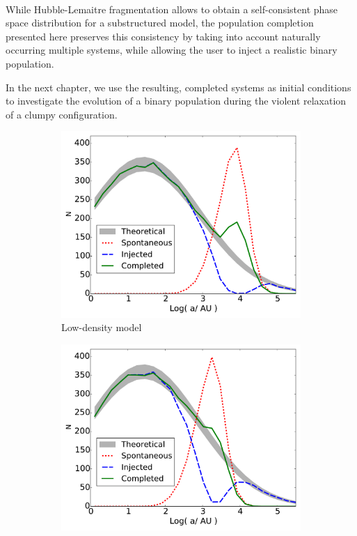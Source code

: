 \paragraph*{}
While Hubble-Lemaitre fragmentation allows to obtain a self-consistent phase space distribution for a substructured model, the population completion presented here preserves this consistency by taking into account naturally occurring multiple systems, while allowing the user to inject a realistic binary population. 

In the next chapter, we use the resulting, completed systems as initial conditions to investigate the evolution of a binary population during the violent relaxation of a clumpy configuration.



\begin{figure}
    \centering
    \begin{subfigure}[b]{0.49\textwidth}
    	\centering
    	\includegraphics[width=\textwidth]{Figures/5_completed_smaxis_LD}
        \caption{Low-density model}
        \label{Fig:5_completed_smaxis_LD}
    \end{subfigure}
    \begin{subfigure}[b]{0.49\textwidth}
    	\centering
    	\includegraphics[width=\textwidth]{Figures/5_completed_smaxis_HD}

\end{subfigure}
\end{figure}
